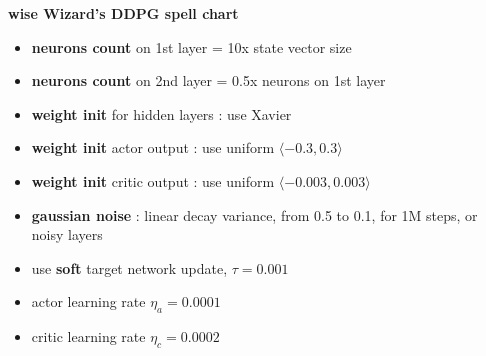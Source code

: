\documentclass[xcolor=dvipsnames]{beamer}
\begin{document}
\begin{frame}{\bf wise Wizard's DDPG spell chart}
  \begin{itemize}
    \item {\bf \color{red} neurons count} on 1st layer = 10x  state vector size
    \item {\bf \color{red} neurons count} on 2nd layer = 0.5x neurons on 1st layer
    \item {\bf \color{red} weight init} for hidden layers : use Xavier
    \item {\bf \color{red} weight init} actor output  : use uniform $\langle -0.3, 0.3 \rangle$
    \item {\bf \color{red} weight init} critic output : use uniform $\langle -0.003, 0.003 \rangle$
    \item {\bf \color{red} gaussian noise} : linear decay variance, from 0.5 to 0.1, for 1M steps, or noisy layers
    \item use {\bf \color{red} soft} target network update, $\tau = 0.001$
    \item actor learning rate $\eta_a = 0.0001$
    \item critic learning rate $\eta_c = 0.0002$
  \end{itemize}
\end{frame}
\end{document}
